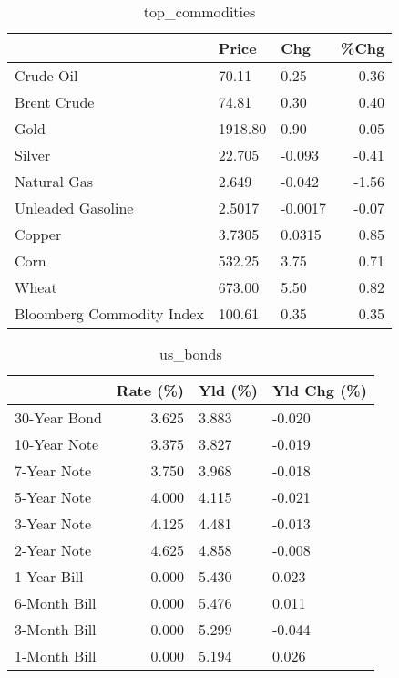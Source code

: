 \documentclass{article}%
\begin{document}
\begin{table}[htbp]%
\caption{top\_commodities}%
\centering%
\begin{adjustbox}{width=1\textwidth}%
\begin{tabular}{lllr}
\toprule
                          &   Price &     Chg &  \%Chg \\
\midrule
               Crude Oil  &   70.11 &    0.25 &  0.36 \\
             Brent Crude  &   74.81 &    0.30 &  0.40 \\
                    Gold  & 1918.80 &    0.90 &  0.05 \\
                  Silver  &  22.705 &  -0.093 & -0.41 \\
             Natural Gas  &   2.649 &  -0.042 & -1.56 \\
       Unleaded Gasoline  &  2.5017 & -0.0017 & -0.07 \\
                  Copper  &  3.7305 &  0.0315 &  0.85 \\
                    Corn  &  532.25 &    3.75 &  0.71 \\
                   Wheat  &  673.00 &    5.50 &  0.82 \\
Bloomberg Commodity Index &  100.61 &    0.35 &  0.35 \\
\bottomrule
\end{tabular}
%
\end{adjustbox}%
\end{table}

%


\begin{table}[htbp]%
\caption{us\_bonds}%
\centering%
\begin{adjustbox}{width=1\textwidth}%
\begin{tabular}{lrll}
\toprule
             &  Rate (\%) & Yld (\%) & Yld Chg (\%) \\
\midrule
30-Year Bond &     3.625 &   3.883 &      -0.020 \\
10-Year Note &     3.375 &   3.827 &      -0.019 \\
 7-Year Note &     3.750 &   3.968 &      -0.018 \\
 5-Year Note &     4.000 &   4.115 &      -0.021 \\
 3-Year Note &     4.125 &   4.481 &      -0.013 \\
 2-Year Note &     4.625 &   4.858 &      -0.008 \\
 1-Year Bill &     0.000 &   5.430 &       0.023 \\
6-Month Bill &     0.000 &   5.476 &       0.011 \\
3-Month Bill &     0.000 &   5.299 &      -0.044 \\
1-Month Bill &     0.000 &   5.194 &       0.026 \\
\bottomrule
\end{tabular}
%
\end{adjustbox}%
\end{table}
\end{document}
